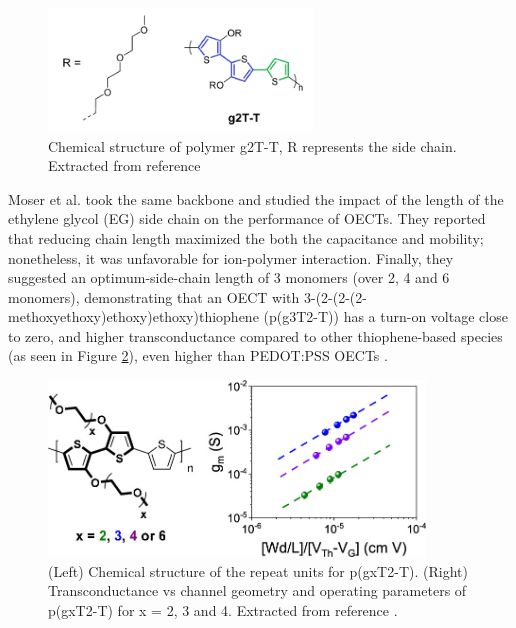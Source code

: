 \begin{figure}[h]
	\centering
	\includegraphics[width=7cm]{Images/g2T-T.png}
	\caption{Chemical structure of polymer g2T-T, R represents the side chain. Extracted from reference \cite{nielsenMolecularDesignSemiconducting2016}}
	\label{fig:g2TT}
\end{figure}

Moser et al. took the same backbone and studied the impact of the length of the ethylene glycol (EG) side chain on the performance of OECTs. They reported that reducing chain length maximized the both the capacitance and mobility; nonetheless, it was unfavorable for ion-polymer interaction. Finally, they suggested an optimum-side-chain length of 3 monomers (over 2, 4 and 6 monomers), demonstrating that an OECT with 3-(2-(2-(2-methoxyethoxy)ethoxy)ethoxy)thiophene (p(g3T2-T)) has a turn-on voltage close to zero, and higher transconductance compared to other thiophene-based species (as seen in Figure \ref{fig:pg3t}), even higher than PEDOT:PSS OECTs %
\cite{moserEthyleneGlycolBasedSide2020}.

\begin{figure}[h]
	\centering
	\includegraphics[width=10cm]{Images/pg3t+perf.jpeg}
	\caption{(Left) Chemical structure of the repeat units for p(gxT2-T). (Right) Transconductance vs channel geometry and operating parameters of p(gxT2-T) for x = 2, 3 and 4. Extracted from reference \cite{moserEthyleneGlycolBasedSide2020}.}
	\label{fig:pg3t}
\end{figure}

